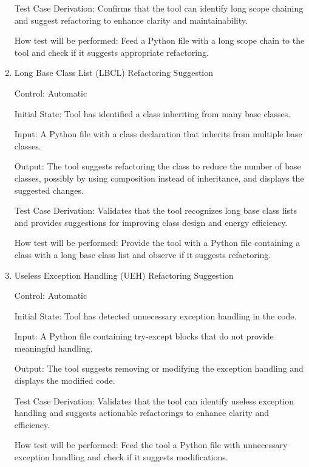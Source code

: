 \documentclass[12pt, titlepage]{article}
\begin{document}
\begin{enumerate}
  Test Case Derivation: Confirms that the tool can identify long scope chaining and suggest refactoring to enhance clarity and maintainability.
            
  How test will be performed: Feed a Python file with a long scope chain to the tool and check if it suggests appropriate refactoring.
  
  \item{Long Base Class List (LBCL) Refactoring Suggestion\\}
  
  Control: Automatic
            
  Initial State: Tool has identified a class inheriting from many base classes.
            
  Input: A Python file with a class declaration that inherits from multiple base classes.
            
  Output: The tool suggests refactoring the class to reduce the number of base classes, possibly by using composition instead of inheritance, and displays the suggested changes.
  
  Test Case Derivation: Validates that the tool recognizes long base class lists and provides suggestions for improving class design and energy efficiency.
            
  How test will be performed: Provide the tool with a Python file containing a class with a long base class list and observe if it suggests refactoring.
  
  \item{Useless Exception Handling (UEH) Refactoring Suggestion\\}
  
  Control: Automatic
            
  Initial State: Tool has detected unnecessary exception handling in the code.
            
  Input: A Python file containing try-except blocks that do not provide meaningful handling.
            
  Output: The tool suggests removing or modifying the exception handling and displays the modified code.
  
  Test Case Derivation: Validates that the tool can identify useless exception handling and suggests actionable refactorings to enhance clarity and efficiency.
            
  How test will be performed: Feed the tool a Python file with unnecessary exception handling and check if it suggests modifications.
  

\end{enumerate}
\end{document}
